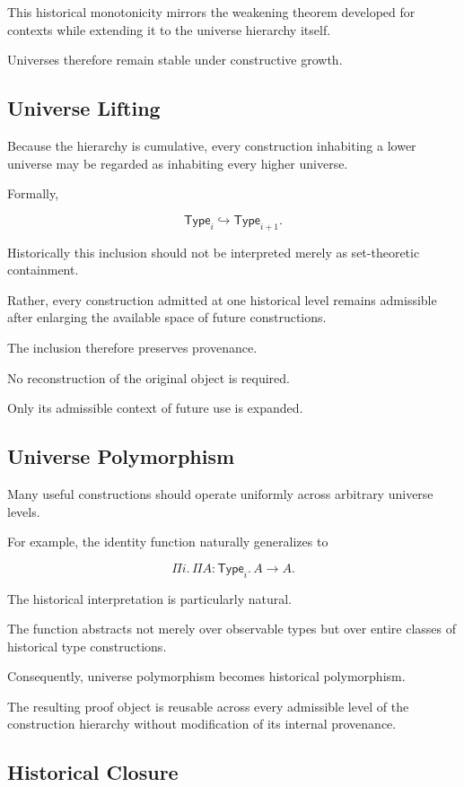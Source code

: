\documentclass[12pt,oneside]{article}
\theoremstyle{definition}
\theoremstyle{remark}
\newcommand{\Type}{\mathsf{Type}}
\begin{document}
This historical monotonicity mirrors the weakening theorem developed for
contexts while extending it to the universe hierarchy itself.

Universes therefore remain stable under constructive growth.

\subsection{Universe Lifting}

Because the hierarchy is cumulative, every construction inhabiting a lower
universe may be regarded as inhabiting every higher universe.

Formally,

\[
\Type_i
\hookrightarrow
\Type_{i+1}.
\]

Historically this inclusion should not be interpreted merely as set-theoretic
containment.

Rather, every construction admitted at one historical level remains admissible
after enlarging the available space of future constructions.

The inclusion therefore preserves provenance.

No reconstruction of the original object is required.

Only its admissible context of future use is expanded.

\subsection{Universe Polymorphism}

Many useful constructions should operate uniformly across arbitrary universe
levels.

For example, the identity function naturally generalizes to

\[
\Pi
i.
\,
\Pi
A:\Type_i.
\,
A
\rightarrow
A.
\]

The historical interpretation is particularly natural.

The function abstracts not merely over observable types but over entire classes
of historical type constructions.

Consequently, universe polymorphism becomes historical polymorphism.

The resulting proof object is reusable across every admissible level of the
construction hierarchy without modification of its internal provenance.

\subsection{Historical Closure}
\end{document}
